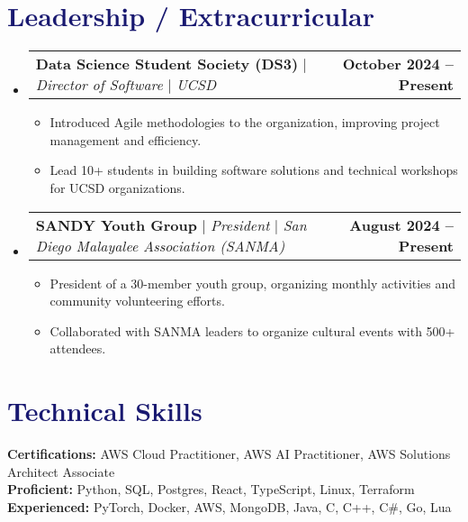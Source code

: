 \documentclass[letterpaper,11pt]{article}
\makeatletter
\newcommand{\resumeItem}[1]{
  \item\small{
    {#1 \vspace{-2pt}}
  }
}
\newcommand{\resumeProjectHeading}[2]{
    \item
    \begin{tabular*}{1.001\textwidth}{l@{\extracolsep{\fill}}r}
      \small#1 & \textbf{\small #2}\\
    \end{tabular*}\vspace{-7pt}
}
\newcommand{\resumeSubHeadingListStart}{\begin{itemize}[leftmargin=0.0in, label={}]}
\newcommand{\resumeSubHeadingListEnd}{\end{itemize}}
\newcommand{\resumeItemListStart}{\begin{itemize}}
\newcommand{\resumeItemListEnd}{\end{itemize}\vspace{-5pt}}
\newcommand\accentColor{MidnightBlue}
\makeatother
\begin{document}
\section{\textcolor{\accentColor}{Leadership / Extracurricular}}
    \vspace{-7pt}
    \resumeSubHeadingListStart
    \resumeProjectHeading
        {\textbf{Data Science Student Society (DS3)} $|$ \emph{Director of Software} $|$ \emph{UCSD}}{October 2024 -- Present}
        \resumeItemListStart
            \resumeItem{Introduced Agile methodologies to the organization, improving project management and efficiency.}
            \resumeItem{Lead 10+ students in building software solutions and technical workshops for UCSD organizations.}
        \resumeItemListEnd
        \vspace{-15pt}  
    \resumeProjectHeading
        {\textbf{SANDY Youth Group} $|$ \emph{President} $|$ \emph{San Diego Malayalee Association (SANMA)}}{August 2024 -- Present}
            \resumeItemListStart
                \resumeItem{President of a 30-member youth group, organizing monthly activities and community volunteering efforts.}
                \resumeItem{Collaborated with SANMA leaders to organize cultural events with 500+ attendees.}
            \resumeItemListEnd
    \resumeSubHeadingListEnd
\vspace{-15pt}
    
\section{\textcolor{\accentColor}{Technical Skills}}
 \begin{itemize}[leftmargin=0.15in, label={}]
    \small{\item{
    \textbf{Certifications: }{AWS Cloud Practitioner, AWS AI Practitioner, AWS Solutions Architect Associate} \\
    \textbf{Proficient: }{Python, SQL, Postgres, React, TypeScript, Linux, Terraform} \\
    \textbf{Experienced: }{PyTorch, Docker, AWS, MongoDB, Java, C, C++, C\#, Go, Lua}
    }}
 \end{itemize}
 \vspace{-8pt}
\end{document}
